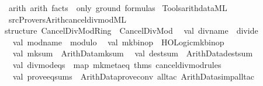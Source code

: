 \begin{isabellebody}
\ arith\ {\isachardoublequoteopen}arith\ facts\ {\isacharminus}{\kern0pt}{\isacharminus}{\kern0pt}\ only\ ground\ formulas{\isachardoublequoteclose}\isanewline
%
\isadelimML
%
\endisadelimML
%
\isatagML
{}\isamarkupfalse%
\ {\isacartoucheopen}Tools{\isacharslash}{\kern0pt}arith{\isacharunderscore}{\kern0pt}data{\isachardot}{\kern0pt}ML{\isacartoucheclose}\isanewline
\isanewline
{}\isamarkupfalse%
\ {\isacartoucheopen}{\isachartilde}{\kern0pt}{\isachartilde}{\kern0pt}{\isacharslash}{\kern0pt}src{\isacharslash}{\kern0pt}Provers{\isacharslash}{\kern0pt}Arith{\isacharslash}{\kern0pt}cancel{\isacharunderscore}{\kern0pt}div{\isacharunderscore}{\kern0pt}mod{\isachardot}{\kern0pt}ML{\isacartoucheclose}\isanewline
\isanewline
{}\isamarkupfalse%
\ {\isacartoucheopen}\isanewline
structure\ Cancel{\isacharunderscore}{\kern0pt}Div{\isacharunderscore}{\kern0pt}Mod{\isacharunderscore}{\kern0pt}Ring\ {\isacharequal}{\kern0pt}\ Cancel{\isacharunderscore}{\kern0pt}Div{\isacharunderscore}{\kern0pt}Mod\isanewline
{\isacharparenleft}{\kern0pt}\isanewline
\ \ val\ div{\isacharunderscore}{\kern0pt}name\ {\isacharequal}{\kern0pt}\ \isactrlconstUNDERSCOREname {\isasymopen}divide{\isasymclose}{\isacharsemicolon}{\kern0pt}\isanewline
\ \ val\ mod{\isacharunderscore}{\kern0pt}name\ {\isacharequal}{\kern0pt}\ \isactrlconstUNDERSCOREname {\isasymopen}modulo{\isasymclose}{\isacharsemicolon}{\kern0pt}\isanewline
\ \ val\ mk{\isacharunderscore}{\kern0pt}binop\ {\isacharequal}{\kern0pt}\ HOLogic{\isachardot}{\kern0pt}mk{\isacharunderscore}{\kern0pt}binop{\isacharsemicolon}{\kern0pt}\isanewline
\ \ val\ mk{\isacharunderscore}{\kern0pt}sum\ {\isacharequal}{\kern0pt}\ Arith{\isacharunderscore}{\kern0pt}Data{\isachardot}{\kern0pt}mk{\isacharunderscore}{\kern0pt}sum{\isacharsemicolon}{\kern0pt}\isanewline
\ \ val\ dest{\isacharunderscore}{\kern0pt}sum\ {\isacharequal}{\kern0pt}\ Arith{\isacharunderscore}{\kern0pt}Data{\isachardot}{\kern0pt}dest{\isacharunderscore}{\kern0pt}sum{\isacharsemicolon}{\kern0pt}\isanewline
\isanewline
\ \ val\ div{\isacharunderscore}{\kern0pt}mod{\isacharunderscore}{\kern0pt}eqs\ {\isacharequal}{\kern0pt}\ map\ mk{\isacharunderscore}{\kern0pt}meta{\isacharunderscore}{\kern0pt}eq\ {\isacharat}{\kern0pt}{\isacharbraceleft}{\kern0pt}thms\ cancel{\isacharunderscore}{\kern0pt}div{\isacharunderscore}{\kern0pt}mod{\isacharunderscore}{\kern0pt}rules{\isacharbraceright}{\kern0pt}{\isacharsemicolon}{\kern0pt}\isanewline
\isanewline
\ \ val\ prove{\isacharunderscore}{\kern0pt}eq{\isacharunderscore}{\kern0pt}sums\ {\isacharequal}{\kern0pt}\ Arith{\isacharunderscore}{\kern0pt}Data{\isachardot}{\kern0pt}prove{\isacharunderscore}{\kern0pt}conv{}\ all{\isacharunderscore}{\kern0pt}tac\ {\isacharparenleft}{\kern0pt}Arith{\isacharunderscore}{\kern0pt}Data{\isachardot}{\kern0pt}simp{\isacharunderscore}{\kern0pt}all{\isacharunderscore}{\kern0pt}tac\isanewline

\end{isabellebody}
